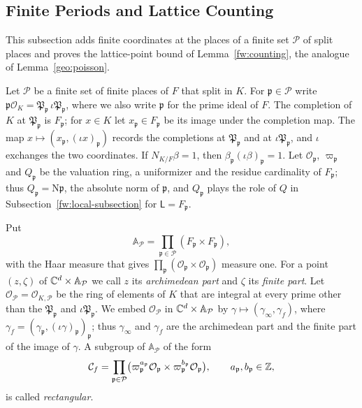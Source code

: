 \subsection{Finite Periods and Lattice Counting}

This subsection adds finite coordinates at the places of a finite set
$\mathcal P$ of split places and proves the lattice-point bound of
Lemma~\ref{fw:counting}, the analogue of Lemma~\ref{geo:poisson}.

Let $\mathcal P$ be a finite set of finite places of $F$ that split in
$K$. For $\mathfrak p\in\mathcal P$ write $\mathfrak p\mathcal
O_K=\mathfrak P_{\mathfrak p}\,\iota\mathfrak P_{\mathfrak p}$, where we
also write $\mathfrak p$ for the prime ideal of $F$. The completion of
$K$ at $\mathfrak P_{\mathfrak p}$ is $F_{\mathfrak p}$; for $x\in K$ let
$x_{\mathfrak p}\in F_{\mathfrak p}$ be its image under the completion
map. The map $x\mapsto(x_{\mathfrak p},(\iota x)_{\mathfrak p})$ records
the completions at $\mathfrak P_{\mathfrak p}$ and at $\iota\mathfrak
P_{\mathfrak p}$, and $\iota$ exchanges the two coordinates. If
$N_{K/F}\beta=1$, then $\beta_{\mathfrak p}(\iota\beta)_{\mathfrak p}=1$.
Let $\mathcal O_{\mathfrak p}$, $\varpi_{\mathfrak p}$ and $Q_{\mathfrak
p}$ be the valuation ring, a uniformizer and the residue cardinality of
$F_{\mathfrak p}$; thus $Q_{\mathfrak p}=\mathrm N\mathfrak p$, the absolute norm of
$\mathfrak p$, and $Q_{\mathfrak p}$ plays the role of $Q$ in
Subsection~\ref{fw:local-subsection} for $\mathsf L=F_{\mathfrak p}$.

\begin{definition}\label{fw:finite-coordinates}
Put
\[
 \mathbb A_{\mathcal P}=\prod_{\mathfrak p\in\mathcal P}
 (F_{\mathfrak p}\times F_{\mathfrak p}),
\]
with the Haar measure that gives $\prod_{\mathfrak p}(\mathcal
O_{\mathfrak p}\times\mathcal O_{\mathfrak p})$ measure one. For a point
$(z,\zeta)$ of $\mathbb C^d\times\mathbb A_{\mathcal P}$ we call $z$ its
\emph{archimedean part} and $\zeta$ its \emph{finite part}. Let
$\mathcal O_{\mathcal P}=\mathcal O_{K,\mathcal P}$ be the ring of elements of $K$
that are integral at every prime other than the $\mathfrak P_{\mathfrak p}$
and $\iota\mathfrak P_{\mathfrak p}$. We embed $\mathcal O_{\mathcal P}$ in
$\mathbb C^d\times\mathbb A_{\mathcal P}$ by
$\gamma\mapsto(\gamma_\infty,\gamma_f)$, where
$\gamma_f=(\gamma_{\mathfrak p},(\iota\gamma)_{\mathfrak p})_{\mathfrak
p}$; thus $\gamma_\infty$ and $\gamma_f$ are the archimedean part and the
finite part of the image of $\gamma$. A subgroup of $\mathbb A_{\mathcal
P}$ of the form
\[
 \mathcal C_f=\prod_{\mathfrak p\in\mathcal P}\bigl(\varpi_{\mathfrak
 p}^{a_{\mathfrak p}}\mathcal O_{\mathfrak p}\times\varpi_{\mathfrak
 p}^{b_{\mathfrak p}}\mathcal O_{\mathfrak p}\bigr),\qquad
 a_{\mathfrak p},b_{\mathfrak p}\in\mathbb Z,
\]
is called \emph{rectangular}.
\end{definition}

